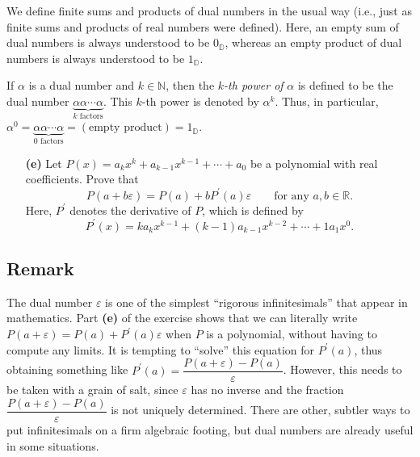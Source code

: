 \documentclass[paper=a4, fontsize=12pt]{scrartcl}%
\theoremstyle{plainsl}
\theoremstyle{definition}
\theoremstyle{remark}
\begin{document}
We define finite sums and products of dual numbers in the usual way (i.e.,
just as finite sums and products of real numbers were defined). Here, an empty
sum of dual numbers is always understood to be $0_{\mathbb{D}}$, whereas an
empty product of dual numbers is always understood to be $1_{\mathbb{D}}$.

If $\alpha$ is a dual number and $k\in\mathbb{N}$, then the $k$\textit{-th
power of }$\alpha$ is defined to be the dual number $\underbrace{\alpha
\alpha\cdots\alpha}_{k\text{ factors}}$. This $k$-th power is denoted by
$\alpha^{k}$. Thus, in particular, $\alpha^{0}=\underbrace{\alpha\alpha
\cdots\alpha}_{0\text{ factors}}=\left(  \text{empty product}\right)
=1_{{\mathbb{D}}}$.

\begin{enumerate}
\item[\textbf{(e)}] Let $P\left(  x \right)  = a_{k} x^{k} + a_{k-1} x^{k-1} +
\cdots+ a_{0}$ be a polynomial with real coefficients. Prove that
\[
P \left(  a + b \varepsilon\right)  = P\left(  a \right)  + b P^{\prime
}\left(  a \right)  \varepsilon\qquad\text{for any } a, b \in\mathbb{R} .
\]
Here, $P^{\prime}$ denotes the derivative of $P$, which is defined by
\[
P^{\prime}\left(  x \right)  = k a_{k} x^{k-1} + \left(  k-1 \right)  a_{k-1}
x^{k-2} + \cdots+ 1 a_{1} x^{0} .
\]

\end{enumerate}

\subsection{Remark}

The dual number $\varepsilon$ is one of the simplest ``rigorous
infinitesimals'' that appear in mathematics. Part \textbf{(e)} of the exercise
shows that we can literally write $P \left(  a + \varepsilon\right)  =
P\left(  a \right)  + P^{\prime}\left(  a \right)  \varepsilon$ when $P$ is a
polynomial, without having to compute any limits. It is tempting to ``solve''
this equation for $P^{\prime}\left(  a \right)  $, thus obtaining something
like $P^{\prime}\left(  a \right)  = \dfrac{P \left(  a + \varepsilon\right)
- P\left(  a \right)  }{\varepsilon}$. However, this needs to be taken with a
grain of salt, since $\varepsilon$ has no inverse and the fraction $\dfrac{P
\left(  a + \varepsilon\right)  - P\left(  a \right)  }{\varepsilon}$ is not
uniquely determined. There are other, subtler ways to put infinitesimals on a
firm algebraic footing, but dual numbers are already useful in some situations.
\end{document}
